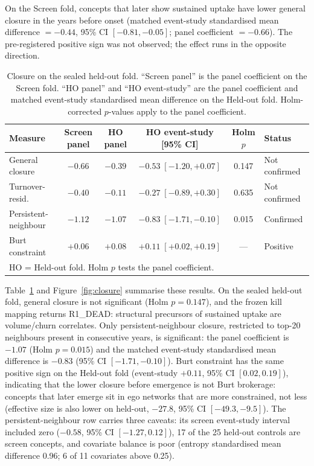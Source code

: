 \documentclass[11pt,letterpaper]{article}
\begin{document}
On the Screen fold, concepts that later show sustained uptake have lower general closure in the years before
onset (matched event-study standardised mean difference $= -0.44$, 95\% CI $[-0.81, -0.05]$; panel
coefficient $= -0.66$). The pre-registered positive sign was not observed; the effect runs in the opposite
direction.

\begin{table}[!htbp]
\centering
\caption{Closure on the sealed held-out fold. ``Screen panel'' is the panel coefficient on
the Screen fold. ``HO panel'' and ``HO event-study'' are the panel coefficient and matched event-study
standardised mean difference on the Held-out fold. Holm-corrected $p$-values apply to the panel coefficient.}
\label{tab:closure}
\footnotesize
\begin{tabularx}{\linewidth}{X c c c c l}
\toprule
Measure & Screen panel & HO panel & HO event-study [95\% CI] & Holm $p$ & Status \\
\midrule
General closure & $-0.66$ & $-0.39$ & $-0.53\;[-1.20, +0.07]$ & 0.147 & Not confirmed \\
Turnover-resid. & $-0.40$ & $-0.11$ & $-0.27\;[-0.89, +0.30]$ & 0.635 & Not confirmed \\
Persistent-neighbour & $-1.12$ & $-1.07$ & $-0.83\;[-1.71, -0.10]$ & 0.015 & Confirmed \\
Burt constraint & $+0.06$ & $+0.08$ & $+0.11\;[+0.02, +0.19]$ & --- & Positive \\
\bottomrule
\multicolumn{6}{l}{\scriptsize HO = Held-out fold. Holm $p$ tests the panel coefficient.}
\end{tabularx}
\end{table}

Table~\ref{tab:closure} and Figure~\ref{fig:closure} summarise these results. On the sealed held-out fold,
general closure is not significant (Holm $p = 0.147$), and the frozen kill mapping returns R1\_DEAD:
structural precursors of sustained uptake are volume/churn correlates. Only persistent-neighbour closure, restricted to top-20 neighbours present in consecutive
years, is significant: the panel coefficient is $-1.07$ (Holm $p = 0.015$) and the matched event-study
standardised mean difference is $-0.83$ (95\% CI $[-1.71, -0.10]$). Burt constraint has the same positive
sign on the Held-out fold (event-study $+0.11$, 95\% CI $[0.02, 0.19]$), indicating that the lower closure
before emergence is not Burt brokerage: concepts that later emerge sit in ego networks that are more
constrained, not less (effective size is also lower on held-out, $-27.8$, 95\% CI $[-49.3, -9.5]$). The
persistent-neighbour row carries three caveats: its screen event-study interval included zero ($-0.58$,
95\% CI $[-1.27, 0.12]$), 17 of the 25 held-out controls are screen concepts, and covariate balance is poor
(entropy standardised mean difference 0.96; 6 of 11 covariates above 0.25).
\end{document}
